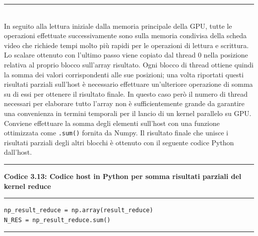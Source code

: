\documentclass[12pt,a4paper]{report}
\begin{document}
\noindent\rule[0.5ex]{\linewidth}{1pt} \\[10pt]
In seguito alla lettura iniziale dalla memoria principale della GPU, tutte le operazioni effettuate successivamente sono sulla memoria condivisa della scheda video che richiede tempi molto più rapidi per le operazioni di lettura e scrittura. \newline
Lo scalare ottenuto con l'ultimo passo viene copiato dal thread 0 nella posizione relativa al proprio blocco sull'array risultato. 
Ogni blocco di thread ottiene quindi la somma dei valori corrispondenti alle sue posizioni; una volta riportati questi risultati parziali sull'host è necessario effettuare un'ulteriore operazione di somma su di essi per ottenere il risultato finale. 
In questo caso però il numero di thread necessari per elaborare tutto l'array non è sufficientemente grande da garantire una convenienza in termini temporali per il lancio di un kernel parallelo su GPU. Conviene effettuare la somma degli elementi sull'host con una funzione ottimizzata come \verb|.sum()| fornita da Numpy. \newline
Il risultato finale che unisce i risultati parziali degli altri blocchi è ottenuto con il seguente codice Python dall'host. \\[10pt]
\noindent\rule[0.5ex]{\linewidth}{2pt}
\small{\textbf{Codice 3.13: Codice host in Python per somma risultati parziali del kernel reduce}} \\
\noindent\rule[0.5ex]{\linewidth}{1pt}
\begin{lstlisting}
np_result_reduce = np.array(result_reduce) 
N_RES = np_result_reduce.sum()
\end{lstlisting}
\noindent\rule[0.5ex]{\linewidth}{1pt} \\[10pt]
\end{document}
